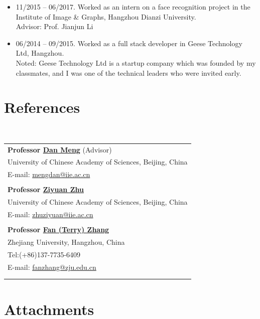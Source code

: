 \documentclass[11pt]{article}
\begin{document}
{\begin{itemize}
\item 11/2015 -- 06/2017. Worked as an intern on a face recognition project in the Institute of Image \& Graphs, Hangzhou Dianzi University. \\
 Advisor: Prof. Jianjun Li
 
\item 06/2014 -- 09/2015. Worked as a full stack developer in Geese Technology Ltd, Hangzhou. \\
 Noted: Geese Technology Ltd is a startup company which was founded by my classmates, and I was one of the technical leaders who were invited early.
\end{itemize}



\section*{References}

\quad\,\,
\begin{tabular}{l}


{\bf Professor \href{http://people.ucas.ac.cn/~md}{Dan Meng}} (Advisor)\\
University of Chinese Academy of Sciences, Beijing, China  \\
E-mail: \href{mailto:mengdan@iie.ac.cn}{mengdan@iie.ac.cn}\\
\\

{\bf Professor \href{http://people.ucas.edu.cn/~0039297}{Ziyuan Zhu}}\\
University of Chinese Academy of Sciences, Beijing, China  \\
E-mail: \href{mailto:zhuziyuan@iie.ac.cn}{zhuziyuan@iie.ac.cn}\\
\\

{\bf Professor \href{https://person.zju.edu.cn/fanzhang}{Fan (Terry) Zhang}}\\
Zhejiang University, Hangzhou, China  \\
Tel:(+86)137-7735-6409 \\
E-mail: \href{mailto:fanzhang@zju.edu.cn}{fanzhang@zju.edu.cn}\\
\\

\quad

\end{tabular}

\section*{Attachments} 
\label{section:sec_attach}

}
\end{document}
